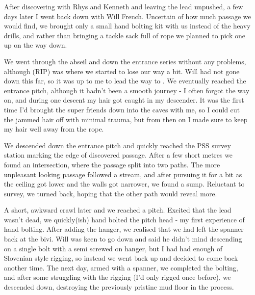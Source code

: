 After discovering  with Rhys and Kenneth and leaving the lead unpushed, a few days later I went back down with Will French. 
Uncertain of how much passage we would find, we brought only a small hand bolting kit with us instead of the heavy drills, and rather than bringing a tackle sack full of rope we planned to pick one up on the way down. 

We went through the abseil and down the entrance series without any problems, although  (RIP) was where we started to lose our way a bit. Will had not gone down this far, so it was up to me to lead the way to . We eventually reached the  entrance pitch, although it hadn't been a smooth journey - I often forgot the way on, and during one descent my hair got caught in my descender. It was the first time I'd brought the super friends down into the caves with me, so I could cut the jammed hair off with minimal trauma, but from then on I made sure to keep my hair well away from the rope.


We descended down the  entrance pitch and quickly reached the PSS survey station marking the edge of discovered passage. After a few short metres we found an intersection, where the passage split into two paths. The more unpleasant looking passage followed a stream, and after pursuing it for a bit as the ceiling got lower and the walls got narrower, we found a sump. Reluctant to survey, we turned back, hoping that the other path would reveal more. 

A short, awkward crawl later and we reached a pitch. Excited that the lead wasn't dead, we quickly(ish) hand bolted the pitch head - my first experience of hand bolting. After adding the hanger, we realised that we had left the spanner back at the bivi. Will was keen to go down and said he didn't mind descending on a single bolt with a semi screwed on hanger, but I had had enough of Slovenian style rigging, so instead we went back up and decided to come back another time.
The next day, armed with a spanner, we completed the bolting, and after some struggling with the rigging (I'd only rigged once before), we descended down, destroying the previously pristine mud floor in the process. 

